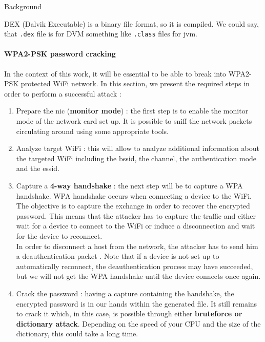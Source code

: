 \begin{chaptercover}{Background}
\begin{indentbox}{1cm}
DEX (Dalvik Executable) is a binary file format, so it is compiled. We could say, that \texttt{.dex} file is for DVM something like \texttt{.class} files for \acrshort{jvm}.
\end{indentbox}

\paragraph{WPA2-PSK password cracking} In the context of this work, it will be essential to be able to break into WPA2-PSK protected WiFi network. In this section, we present the required steps in order to perform a successful attack :
\begin{enumerate}
  \item Prepare the \acrshort{nic} (\textbf{monitor mode}) : the first step is to enable the monitor mode of the network card set up. It is possible to sniff the network packets circulating around using some appropriate tools.
  \item Analyze target WiFi : this will allow to analyze additional information about the targeted WiFi including the \acrshort{bssid}, the channel, the authentication mode and the \acrshort{essid}.
  \item Capture a \textbf{4-way handshake} : the next step will be to capture a WPA handshake. WPA handshake occurs when connecting a device to the WiFi. The objective is to capture the exchange in order to recover the encrypted password. This means that the attacker has to capture the traffic and either wait for a device to connect to the WiFi or induce a disconnection and wait for the device to reconnect. \newline \\
  In order to disconnect a host from the network, the attacker has to send him a deauthentication packet \cite{deauthentication}. Note that if a device is not set up to automatically reconnect, the deauthentication process may have succeeded, but we will not get the WPA handshake until the device connects once again.
  \item Crack the password : having a capture containing the handshake, the encrypted password is in our hands within the generated file. It still remains to crack it which, in this case, is possible through either \textbf{bruteforce or dictionary attack}. Depending on the speed of your CPU and the size of the dictionary, this could take a long time.
\end{enumerate}


\end{chaptercover}

